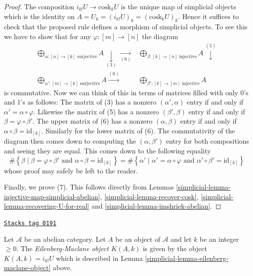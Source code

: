 \begin{proof}
\medskip\noindent
The composition $i_{k!}U \to \text{cosk}_kU$ is the
unique map of simplicial objects which is
the identity on $A = U_k = (i_{k!}U)_k = (\text{cosk}_kU)_k$.
Hence it suffices to check that the proposed rule defines
a morphism of simplicial objects.
To see this we have to show that
for any $\varphi : [m] \to [n]$ the diagram
$$
\begin{array}{cc}\bigoplus_{\alpha : [n] \to [k]\text{ surjective}} A
\underset{(3)}{\downarrow}\underset{(6)}{\longrightarrow} & \bigoplus_{\beta : [k] \to [n]\text{ injective}} A
\overset{(5)}{\downarrow} \\ \bigoplus_{\alpha' : [m] \to [k]\text{ surjective}} A
\overset{(6)}{\longrightarrow} & \bigoplus_{\beta' : [k] \to [m]\text{ injective}} A\end{array}
$$
is commutative. Now we can think of this in terms of
matrices filled with only $0$'s and $1$'s as follows:
The matrix of (3) has a nonzero
$(\alpha', \alpha)$ entry if and only if
$\alpha' = \alpha \circ \varphi$. Likewise
the matrix of (5) has a nonzero
$(\beta', \beta)$ entry if and only if
$\beta = \varphi \circ \beta'$. The upper matrix
of (6) has a nonzero $(\alpha, \beta)$ entry if and only if
$\alpha \circ \beta = \text{id}_{[k]}$. Similarly for the
lower matrix of (6). The commutativity of the
diagram then comes down to computing the
$(\alpha, \beta')$ entry for both compositions
and seeing they are equal. This comes down to the
following equality
$$
\# \left\{
\beta
\mid
\beta = \varphi \circ \beta'
\text{ and }
\alpha \circ \beta = \text{id}_{[k]}
\right\}
=
\# \left\{
\alpha'
\mid
\alpha' = \alpha \circ \varphi
\text{ and }
\alpha' \circ \beta' = \text{id}_{[k]}
\right\}
$$
whose proof may safely be left to the reader.

\medskip\noindent
Finally, we prove (7). This follows directly from
Lemmas \ref{simplicial-lemma-injective-map-simplicial-abelian},
\ref{simplicial-lemma-recover-cosk}, \ref{simplicial-lemma-recovering-U-for-real}
and \ref{simplicial-lemma-imshriek-abelian}.
\end{proof}

\begin{definition}
\label{simplicial-definition-eilenberg-maclane}
\href{https://stacks.math.columbia.edu/tag/0191}{\texttt{Stacks tag 0191}}

Let $\mathcal{A}$ be an abelian category.
Let $A$ be an object of $\mathcal{A}$ and
let $k$ be an integer $\geq 0$.
The {\it Eilenberg-Maclane object $K(A, k)$}
is given by the object $K(A, k) = i_{k!}U$
which is described in
Lemma \ref{simplicial-lemma-eilenberg-maclane-object} above.
\end{definition}


